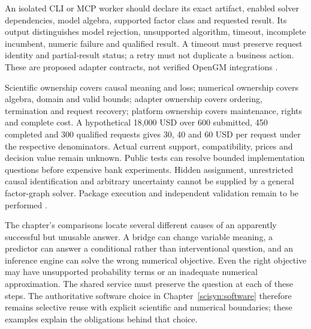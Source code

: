 An isolated CLI or MCP worker should declare its exact artifact, enabled
solver dependencies, model algebra, supported factor class and requested
result. Its output distinguishes model rejection, unsupported algorithm,
timeout, incomplete incumbent, numeric failure and qualified result. A
timeout must preserve request identity and partial-result status; a retry
must not duplicate a business action. These are proposed adapter contracts,
not verified OpenGM integrations \citep{exec24_opengm_choice}.

Scientific ownership covers causal meaning and loss; numerical ownership
covers algebra, domain and valid bounds; adapter ownership covers ordering,
termination and request recovery; platform ownership covers maintenance,
rights and complete cost. A hypothetical 18,000 USD over 600 submitted,
450 completed and 300 qualified requests gives 30, 40 and 60 USD per request
under the respective denominators. Actual current support, compatibility,
prices and decision value remain unknown. Public tests can resolve bounded
implementation questions before expensive bank experiments. Hidden
assignment, unrestricted causal identification and arbitrary uncertainty
cannot be supplied by a general factor-graph solver. Package execution and
independent validation remain to be performed
\citep{exec24_opengm_choice}.

The chapter's comparisons locate several different causes of an apparently
successful but unusable answer. A bridge can change variable meaning, a
predictor can answer a conditional rather than interventional question, and
an inference engine can solve the wrong numerical objective. Even the right
objective may have unsupported probability terms or an inadequate numerical
approximation. The shared service must preserve the question at each of
these steps. The authoritative software choice in
Chapter~\ref{scisyn:software} therefore remains selective reuse with explicit
scientific and numerical boundaries; these examples explain the obligations
behind that choice.
